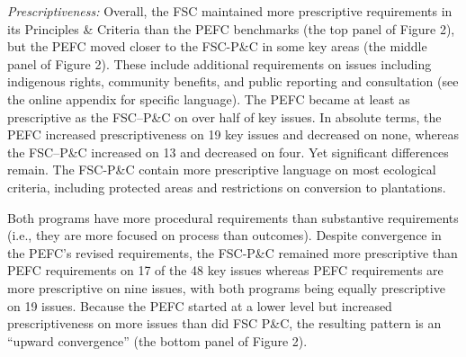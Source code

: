 \documentclass[
      12pt,
            Review ]{article}
\begin{document}
\emph{Prescriptiveness:} Overall, the FSC maintained more prescriptive
requirements in its Principles \& Criteria than the PEFC benchmarks (the
top panel of Figure 2), but the PEFC moved closer to the FSC-P\&C in
some key areas (the middle panel of Figure 2). These include additional
requirements on issues including indigenous rights, community benefits,
and public reporting and consultation (see the online appendix for
specific language). The PEFC became at least as prescriptive as the
FSC--P\&C on over half of key issues. In absolute terms, the PEFC
increased prescriptiveness on 19 key issues and decreased on none,
whereas the FSC--P\&C increased on 13 and decreased on four. Yet
significant differences remain. The FSC-P\&C contain more prescriptive
language on most ecological criteria, including protected areas and
restrictions on conversion to plantations.

Both programs have more procedural requirements than substantive
requirements (i.e., they are more focused on process than outcomes).
Despite convergence in the PEFC's revised requirements, the FSC-P\&C
remained more prescriptive than PEFC requirements on 17 of the 48 key
issues whereas PEFC requirements are more prescriptive on nine issues,
with both programs being equally prescriptive on 19 issues. Because the
PEFC started at a lower level but increased prescriptiveness on more
issues than did FSC P\&C, the resulting pattern is an ``upward
convergence'' (the bottom panel of Figure 2).
\end{document}
